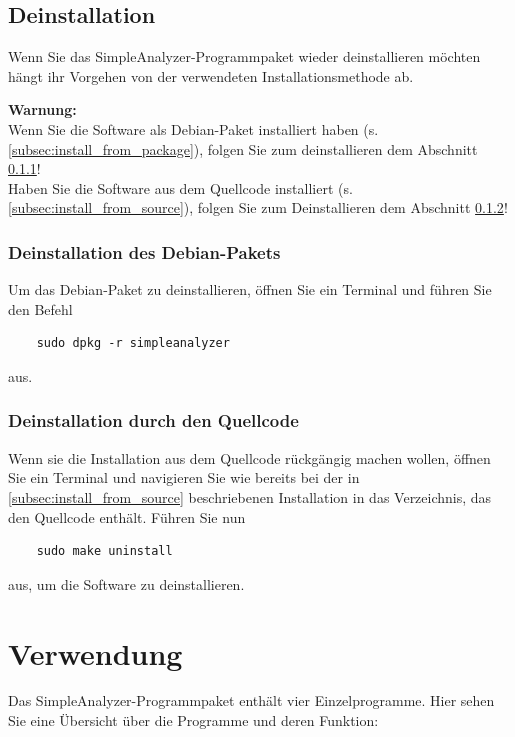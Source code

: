 \documentclass[10pt,a5paper,twoside,titlepage]{scrartcl}
\newenvironment{myshaded}
  {\def\FrameCommand{\colorbox{shadecolor}}
    \MakeFramed {\advance\hsize-\width \FrameRestore}}
 {\endMakeFramed}
\newenvironment{warnung}
  {\colorlet{shadecolor}{yellow!20}%
      \begin{myshaded}
      \begin{minipage}{\linewidth}
	  \hangindent 20pt  
      \textbf{Warnung:}\\
      }
  {\end{minipage}\end{myshaded}}
\def\pkname{SimpleAnalyzer}
\begin{document}
	\subsection{Deinstallation}
	Wenn Sie das \pkname -Programmpaket wieder deinstallieren möchten hängt ihr Vorgehen von der verwendeten Installationsmethode ab.
	\begin{warnung}
	Wenn Sie die Software als Debian-Paket installiert haben (s. \ref{subsec:install_from_package}), folgen Sie zum deinstallieren dem Abschnitt \ref{subsec:uninstall_debian}!\\
	Haben Sie die Software aus dem Quellcode installiert (s. \ref{subsec:install_from_source}), folgen Sie zum Deinstallieren dem Abschnitt \ref{subsec:uninstall_code}!
	\end{warnung}
	\subsubsection{Deinstallation des Debian-Pakets}
	\label{subsec:uninstall_debian}
	Um das Debian-Paket zu deinstallieren, öffnen Sie ein Terminal und führen Sie den Befehl
	\begin{lstlisting}
	sudo dpkg -r simpleanalyzer
	\end{lstlisting}
	aus. 
	\subsubsection{Deinstallation durch den Quellcode}
	\label{subsec:uninstall_code}
	Wenn sie die Installation aus dem Quellcode rückgängig machen wollen, öffnen Sie ein Terminal und navigieren Sie wie bereits bei der in \ref{subsec:install_from_source} beschriebenen Installation in das Verzeichnis, das den Quellcode enthält.
	Führen Sie nun
	\begin{lstlisting}
	sudo make uninstall
	\end{lstlisting}
	aus, um die Software zu deinstallieren.
	\newpage
	\section{Verwendung}
	Das \pkname -Programmpaket enthält vier Einzelprogramme. Hier sehen Sie eine Übersicht über die Programme und deren Funktion:\\
	
\end{document}
